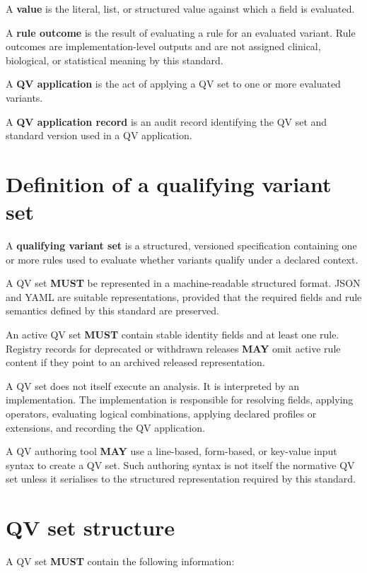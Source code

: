 \documentclass[11pt,a4paper]{article}
\begin{document}
A \textbf{value} is the literal, list, or structured value against which a field is evaluated.

A \textbf{rule outcome} is the result of evaluating a rule for an evaluated variant. Rule outcomes are implementation-level outputs and are not assigned clinical, biological, or statistical meaning by this standard.

A \textbf{QV application} is the act of applying a QV set to one or more evaluated variants.

A \textbf{QV application record} is an audit record identifying the QV set and standard version used in a QV application.

\section{Definition of a qualifying variant set}

A \textbf{qualifying variant set} is a structured, versioned specification containing one or more rules used to evaluate whether variants qualify under a declared context.

A QV set \textbf{MUST} be represented in a machine-readable structured format. JSON and YAML are suitable representations, provided that the required fields and rule semantics defined by this standard are preserved.

An active QV set \textbf{MUST} contain stable identity fields and at least one rule. Registry records for deprecated or withdrawn releases \textbf{MAY} omit active rule content if they point to an archived released representation.

A QV set does not itself execute an analysis. It is interpreted by an implementation. The implementation is responsible for resolving fields, applying operators, evaluating logical combinations, applying declared profiles or extensions, and recording the QV application.

A QV authoring tool \textbf{MAY} use a line-based, form-based, or key-value input syntax to create a QV set. Such authoring syntax is not itself the normative QV set unless it serialises to the structured representation required by this standard.

\section{QV set structure}

A QV set \textbf{MUST} contain the following information:
\end{document}

